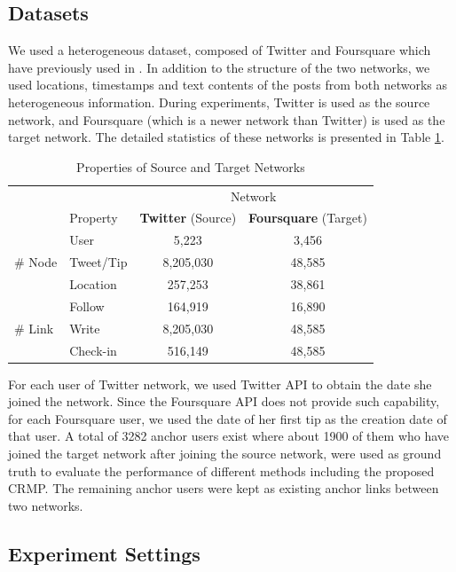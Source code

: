 \documentclass[conference]{IEEEtran}
\begin{document}
\subsection{Datasets}
We used a heterogeneous dataset, composed of Twitter and Foursquare which have previously used in \cite{zhang2014meta, zhang2014transferring, zhang2013predicting, zhang2015integrated}. In addition to the structure of the two networks, we used locations, timestamps and text contents of the posts from both networks as heterogeneous information. During experiments, Twitter is used as the source network, and Foursquare (which is a newer network than Twitter) is used as the target network. The detailed statistics of these networks is presented in Table \ref{table:dataset}.

\begin{table}
\centering
\caption{Properties of Source and Target Networks}
\label{table:dataset}
\begin{tabular}{l l c c}
\toprule
& & \multicolumn{2}{c}{Network} \\
\cmidrule(l){3-4}
& Property & \textbf{Twitter} (Source) & \textbf{Foursquare} (Target)\\
\midrule %
& User & 5,223 & 3,456 \\ %
\# Node & Tweet/Tip & 8,205,030 & 48,585 \\ %
& Location & 257,253 & 38,861 \\ %
\midrule
& Follow & 164,919 & 16,890 \\ %
\# Link & Write & 8,205,030 & 48,585 \\ %
& Check-in & 516,149 & 48,585 \\ %
\bottomrule %
\end{tabular}
\end{table}

For each user of Twitter network, we used Twitter API to obtain the date she joined the network. Since the Foursquare API does not provide such capability, for each Foursquare user, we used the date of her first tip as the creation date of that user. A total of 3282 anchor users exist where about 1900 of them who have joined the target network after joining the source network, were used as ground truth to evaluate the performance of different methods including the proposed CRMP. The remaining anchor users were kept as existing anchor links between two networks.

\subsection{Experiment Settings}
\end{document}
